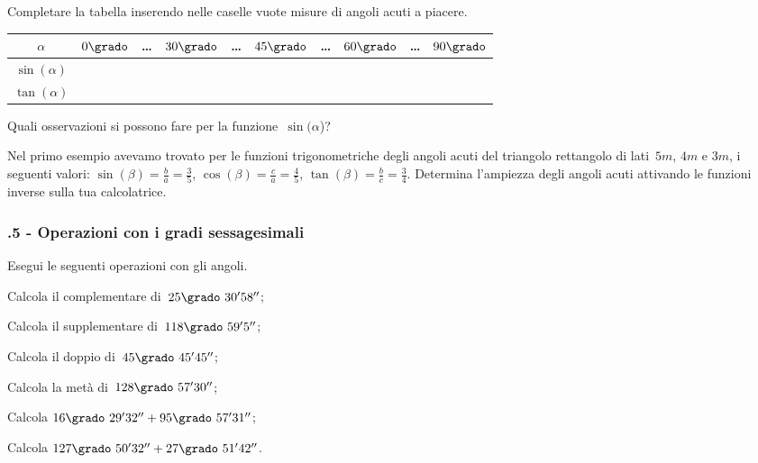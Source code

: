 \begin{esercizio}
\label{ese:G.4}
Completare la tabella inserendo nelle caselle vuote misure di angoli acuti a piacere.
\begin{center}
\begin{tabular}{cccccccccc}
\toprule
$\alpha$ & $0\grado$ & \ldots & $30\grado$ & \ldots & $45\grado$ & \ldots & $60\grado$ & \ldots & $90\grado$\\
\midrule
$\sin(\alpha)$ & & & & &  &  &  &  &  \\
$\tan(\alpha)$ & & &  &  &  &  &  &  &  \\
\bottomrule
\end{tabular}
\end{center}

Quali osservazioni si possono fare per la funzione~$\sin({\alpha}$)?
\end{esercizio}

\begin{esercizio}
\label{ese:G.5}
Nel primo esempio avevamo trovato per le funzioni trigonometriche degli angoli acuti del triangolo rettangolo di lati~$5\unit{m}$,
$4\unit{m}$ e $3\unit{m}$, i seguenti valori:
$\sin(\beta)=\frac{b}{a}=\frac{3}{5}$, $\cos(\beta)=\frac{c}{a}=\frac{4}{5}$, $\tan(\beta)=\frac{b}{c}=\frac{3}{4}$.
Determina l'ampiezza degli angoli acuti attivando le funzioni inverse sulla tua calcolatrice.
\end{esercizio}

\subsubsection*{\thechapter.5 - Operazioni con i gradi sessagesimali}

\begin{esercizio}
\label{ese:G.6}
Esegui le seguenti operazioni con gli angoli.
\begin{multicols}{2}
\begin{enumeratea}
 \item Calcola il complementare di~$25\grado~30' 58''$;
 \item Calcola il supplementare di~$118\grado~59' 5''$;
 \item Calcola il doppio di~$45\grado~45' 45''$;
 \item Calcola la metà di~$128\grado~57' 30''$;
 \item Calcola $16\grado~29' 32''+ 95\grado~57' 31''$;
 \item Calcola $127\grado~50' 32''+ 27\grado~51' 42''$.
\end{enumeratea}
\end{multicols}
\end{esercizio}

